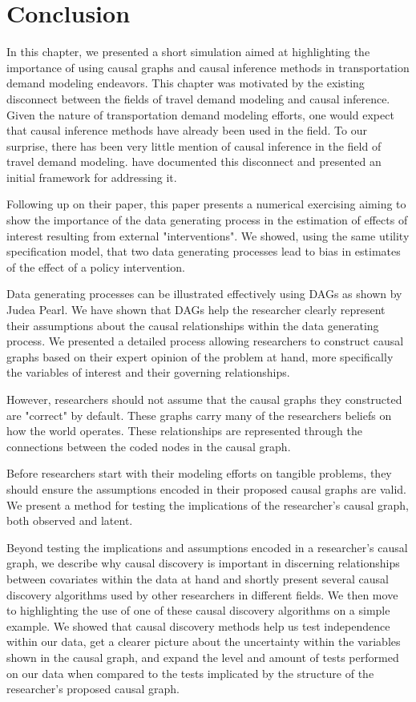 \section{Conclusion}
\label{sec:conclusion}

In this chapter, we presented a short simulation aimed at highlighting the importance of using causal graphs and causal inference methods in transportation demand modeling endeavors.
This chapter was motivated by the existing disconnect between the fields of travel demand modeling
and causal inference.
Given the nature of transportation demand modeling efforts, one would expect that
causal inference methods have already been used in the field. To our surprise, there
has been very little mention of causal inference in the field of travel demand modeling.
\citet{brathwaite_2018_causal} have documented this disconnect and 
presented an initial framework for addressing it.

Following up on their paper, this paper presents a numerical exercising aiming to show
the importance of the data generating process in the estimation of effects of interest resulting from 
external "interventions". We showed, using the same utility specification model, that two data 
generating processes lead to bias in estimates of the effect of a policy intervention.

Data generating processes can be illustrated effectively using DAGs as shown by Judea Pearl.
We have shown that DAGs help the researcher clearly represent their assumptions about the
causal relationships within the data generating process. We presented a detailed process allowing researchers
to construct causal graphs based on their expert opinion of the problem at hand, more specifically
the variables of interest and their governing relationships. 

However, researchers should not assume that the causal graphs they constructed are "correct"
by default. These graphs carry many of the researchers beliefs on how the world operates.
These relationships are represented through the connections between the coded nodes in the causal graph.

Before researchers start with their modeling efforts on tangible problems, 
they should ensure the assumptions encoded in their proposed causal graphs are valid.
We present a method for testing the implications of the researcher's causal graph, both observed and latent.

Beyond testing the implications and assumptions encoded in a researcher's causal graph,
we describe why causal discovery is important in discerning relationships between covariates
within the data at hand and shortly present several causal discovery algorithms used by
other researchers in different fields. 
We then move to highlighting the use of one of these causal discovery algorithms on 
a simple example. We showed that causal discovery methods help us test independence within our data,
get a clearer picture about the uncertainty within the variables shown in the causal graph,
and expand the level and amount of tests performed on our data when compared to the tests
implicated by the structure of the researcher's proposed causal graph.

